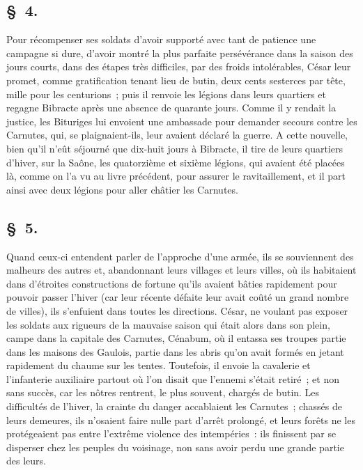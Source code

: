 \documentclass[french,twoside]{book} %
\begin{document}
\subsection[{§ 4.}]{ \textsc{§ 4.} }
\noindent Pour récompenser ses soldats d’avoir supporté avec tant de patience une campagne si dure, d’avoir montré la plus parfaite persévérance dans la saison des jours courts, dans des étapes très difficiles, par des froids intolérables, César leur promet, comme gratification tenant lieu de butin, deux cents sesterces par tête, mille pour les centurions ; puis il renvoie les légions dans leurs quartiers et regagne Bibracte après une absence de quarante jours. Comme il y rendait la justice, les Bituriges lui envoient une ambassade pour demander secours contre les Carnutes, qui, se plaignaient-ils, leur avaient déclaré la guerre. A cette nouvelle, bien qu’il n’eût séjourné que dix-huit jours à Bibracte, il tire de leurs quartiers d’hiver, sur la Saône, les quatorzième et sixième légions, qui avaient été placées là, comme on l’a vu au livre précédent, pour assurer le ravitaillement, et il part ainsi avec deux légions pour aller châtier les Carnutes.
\subsection[{§ 5.}]{ \textsc{§ 5.} }
\noindent Quand ceux-ci entendent parler de l’approche d’une armée, ils se souviennent des malheurs des autres et, abandonnant leurs villages et leurs villes, où ils habitaient dans d’étroites constructions de fortune qu’ils avaient bâties rapidement pour pouvoir passer l’hiver (car leur récente défaite leur avait coûté un grand nombre de villes), ils s’enfuient dans toutes les directions. César, ne voulant pas exposer les soldats aux rigueurs de la mauvaise saison qui était alors dans son plein, campe dans la capitale des Carnutes, Cénabum, où il entassa ses troupes partie dans les maisons des Gaulois, partie dans les abris qu’on avait formés en jetant rapidement du chaume sur les tentes. Toutefois, il envoie la cavalerie et l’infanterie auxiliaire partout où l’on disait que l’ennemi s’était retiré ; et non sans succès, car les nôtres rentrent, le plus souvent, chargés de butin. Les difficultés de l’hiver, la crainte du danger accablaient les Carnutes ; chassés de leurs demeures, ils n’osaient faire nulle part d’arrêt prolongé, et leurs forêts ne les protégeaient pas entre l’extrême violence des intempéries : ils finissent par se disperser chez les peuples du voisinage, non sans avoir perdu une grande partie des leurs.
\end{document}
